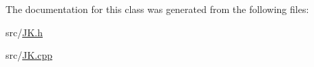 The documentation for this class was generated from the following files:\begin{DoxyCompactItemize}
\item 
src/\hyperlink{JK_8h}{JK.h}\item 
src/\hyperlink{JK_8cpp}{JK.cpp}\end{DoxyCompactItemize}
